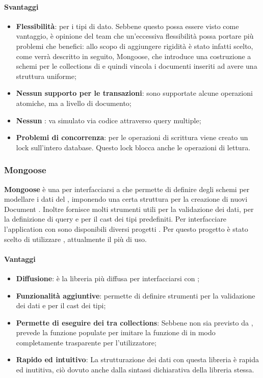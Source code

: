 \paragraph{Svantaggi}
\begin{itemize}
\item \textbf{Flessibilità}: per i tipi di dato. Sebbene questo possa essere visto come vantaggio,
è opinione del team che un’eccessiva flessibilità possa portare più problemi che
benefici: allo scopo di aggiungere rigidità è stato infatti scelto, come verrà descritto
in seguito, Mongoose, che introduce una costruzione a schemi per le collections di
 e quindi vincola i documenti inseriti ad avere una struttura uniforme;
\item \textbf{Nessun supporto per le transazioni}: sono supportate alcune operazioni atomiche,
ma a livello di documento;
\item \textbf{Nessun }: va simulato via codice attraverso query multiple;
\item \textbf{Problemi di concorrenza}: per le operazioni di scrittura viene creato un lock
sull’intero database. Questo lock blocca anche le operazioni di lettura.
\end{itemize}
	\subsubsection{Mongoose}
\textbf{Mongoose} è una  per interfacciarsi a  che permette di definire degli schemi per modellare i dati del , imponendo una certa struttura per la creazione di nuovi Document . Inoltre fornisce molti strumenti utili per la validazione dei dati, per la definizione di query e per il cast dei tipi predefiniti.
Per interfacciare l'application  con  sono disponibili diversi progetti . Per questo progetto è stato scelto di utilizzare  , attualmente il più di uso.

\paragraph{Vantaggi}
\begin{itemize}
\item \textbf{Diffusione}: è la libreria più diffusa per interfacciarsi con ;
\item \textbf{Funzionalità aggiuntive}: permette di definire strumenti per la validazione dei
dati e per il cast dei tipi;
\item \textbf{Permette di eseguire dei  tra collections}: Sebbene non sia previsto da
,  prevede la funzione populate per imitare la funzione di  in modo completamente trasparente per l’utilizzatore;
\item \textbf{Rapido ed intuitivo}: La strutturazione dei dati con questa libreria è rapida ed
inutitiva, ciò dovuto anche dalla sintassi dichiarativa della libreria stessa.
\end{itemize}

